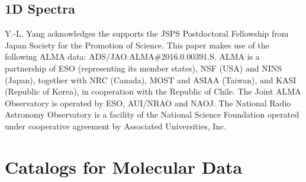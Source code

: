 \documentclass[twocolumn]{aastex62}
\newcommand{\methanol}{\mbox{CH$_{3}$OH}}
\begin{document}

\subsection{1D Spectra}

% 






% 

\acknowledgements
Y.-L. Yang acknowledges the supports the JSPS Postdoctoral Fellowship from Japan Society for the Promotion of Science.  This paper makes use of the following ALMA data: ADS/JAO.ALMA\#2016.0.00391.S. ALMA is a partnership of ESO (representing its member states), NSF (USA) and NINS (Japan), together with NRC (Canada), MOST and ASIAA (Taiwan), and KASI (Republic of Korea), in cooperation with the Republic of Chile. The Joint ALMA Observatory is operated by ESO, AUI/NRAO and NAOJ.  The National Radio Astronomy Observatory is a facility of the National Science Foundation operated under cooperative agreement by Associated Universities, Inc.



\appendix
\section{Catalogs for Molecular Data}
\label{sec:catalogs}


\end{document}

